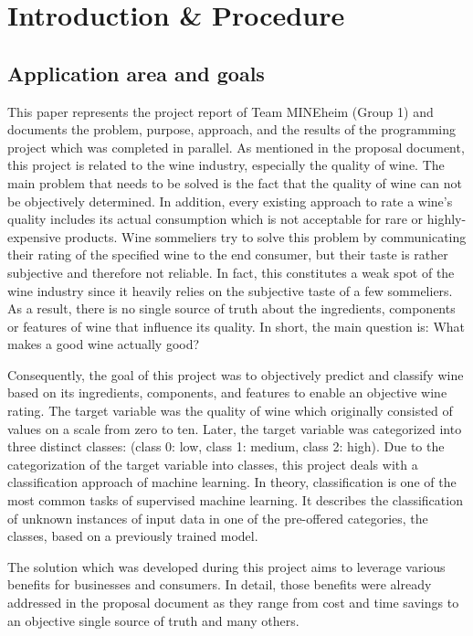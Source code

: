 \chapter{Introduction \& Procedure}
\section{Application area and goals}


This paper represents the project report of Team MINEheim (Group 1) and documents the problem, purpose, approach, and the results of the programming project which was completed in parallel. As mentioned in the proposal document, this project is related to the wine industry, especially the quality of wine. The main problem that needs to be solved is the fact that the quality of wine can not be objectively determined. In addition, every existing approach to rate a wine's quality includes its actual consumption which is not acceptable for rare or highly-expensive products. Wine sommeliers try to solve this problem by communicating their rating of the specified wine to the end consumer, but their taste is rather subjective and therefore not reliable. In fact, this constitutes a weak spot of the wine industry since it heavily relies on the subjective taste of a few sommeliers. As a result, there is no single source of truth about the ingredients, components or features of wine that influence its quality. In short, the main question is: What makes a good wine actually good?

Consequently, the goal of this project was to objectively predict and classify wine based on its ingredients, components, and features to enable an objective wine rating. The target variable was the quality of wine which originally consisted of values on a scale from zero to ten. Later, the target variable was categorized into three distinct classes: (class 0: low, class 1: medium, class 2: high). Due to the categorization of the target variable into classes, this project deals with a classification approach of machine learning. In theory, classification is one of the most common tasks of supervised machine learning. It describes the classification of unknown instances of input data in one of the pre-offered categories, the classes, based on a previously trained model. \citep{Novakovic2010}

The solution which was developed during this project aims to leverage various benefits for businesses and consumers. In detail, those benefits were already addressed in the proposal document as they range from cost and time savings to an objective single source of truth and many others. 